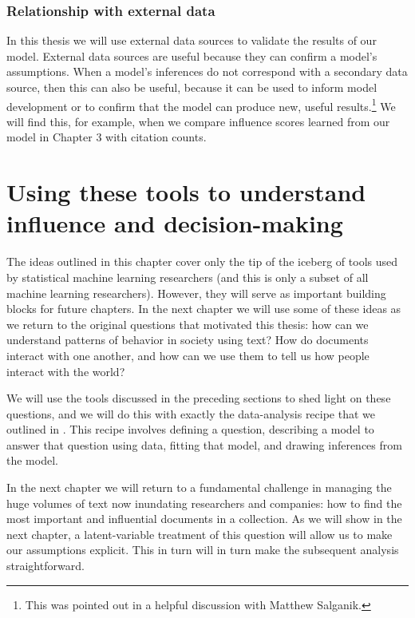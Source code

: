 \subsubsection{Relationship with external data}
In this thesis we will use external data sources to validate the
results of our model.  External data sources are useful because they
can confirm a model's assumptions.  When a model's inferences do not
correspond with a secondary data source, then this can also be useful,
because it can be used to inform model development or to confirm that
the model can produce new, useful results.\footnote{This was
  pointed out in a helpful discussion with Matthew Salganik.}  We will
find this, for example, when we compare influence scores learned from
our model in Chapter 3 with citation counts.

\section{Using these tools to understand influence and decision-making}

The ideas outlined in this chapter cover only the tip of the iceberg
of tools used by statistical machine learning researchers
(and this is only a subset of all machine learning researchers).
However, they will serve as important building blocks for future
chapters.  In the next chapter we will use some of these ideas as we
return to the original questions that motivated this thesis: how can
we understand patterns of behavior in society using text?  How do
documents interact with one another, and how can we use them to tell
us how people interact with the world?

We will use the tools discussed in the preceding sections to shed
light on these questions, and we will do this with exactly the
data-analysis recipe that we outlined in
.  This recipe involves defining a question,
describing a model to answer that question using data, fitting that
model, and drawing inferences from the model.
 
In the next chapter we will return to a fundamental challenge in
managing the huge volumes of text now inundating researchers and
companies: how to find the most important and influential documents in
a collection.  As we will show in the next chapter, a latent-variable
treatment of this question will allow us to make our assumptions
explicit.  This in turn will in turn make the subsequent analysis
straightforward.
